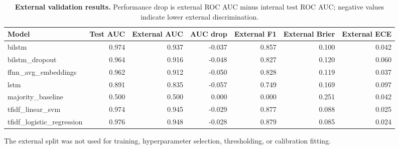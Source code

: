\begin{table}[!ht]
\centering
\caption{\textbf{External validation results.} Performance drop is external ROC AUC minus internal test ROC AUC; negative values indicate lower external discrimination.}
\small
\begin{tabular}{lrrrrrr}
\hline
Model & Test AUC & External AUC & AUC drop & External F1 & External Brier & External ECE \\
\hline
bilstm & 0.974 & 0.937 & -0.037 & 0.857 & 0.100 & 0.042 \\
bilstm\_dropout & 0.964 & 0.916 & -0.048 & 0.827 & 0.120 & 0.060 \\
ffnn\_avg\_embeddings & 0.962 & 0.912 & -0.050 & 0.828 & 0.119 & 0.037 \\
lstm & 0.891 & 0.835 & -0.057 & 0.749 & 0.169 & 0.097 \\
majority\_baseline & 0.500 & 0.500 & 0.000 & 0.000 & 0.251 & 0.042 \\
tfidf\_linear\_svm & 0.974 & 0.945 & -0.029 & 0.877 & 0.088 & 0.025 \\
tfidf\_logistic\_regression & 0.976 & 0.948 & -0.028 & 0.879 & 0.085 & 0.024 \\
\hline
\end{tabular}
\begin{flushleft}\footnotesize The external split was not used for training, hyperparameter selection, thresholding, or calibration fitting.\end{flushleft}
\label{tab:external}
\end{table}
